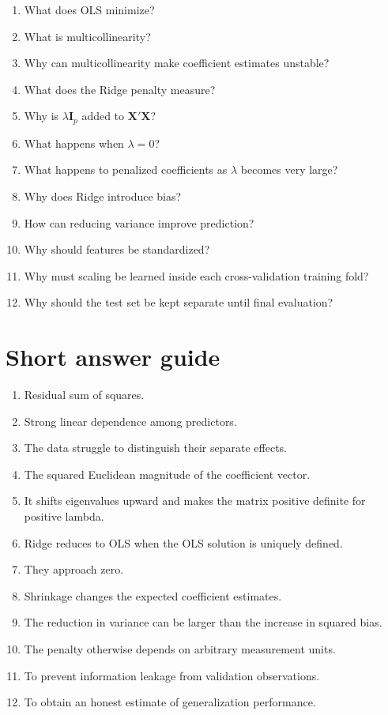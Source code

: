 \documentclass[11pt,a4paper,oneside]{book}
\theoremstyle{remark}
\newcommand{\X}{\mathbf X}
\newcommand{\I}{\mathbf I}
\begin{document}
\begin{enumerate}
\item What does OLS minimize?
\item What is multicollinearity?
\item Why can multicollinearity make coefficient estimates unstable?
\item What does the Ridge penalty measure?
\item Why is $\lambda\I_p$ added to $\X'\X$?
\item What happens when $\lambda=0$?
\item What happens to penalized coefficients as $\lambda$ becomes very large?
\item Why does Ridge introduce bias?
\item How can reducing variance improve prediction?
\item Why should features be standardized?
\item Why must scaling be learned inside each cross-validation training fold?
\item Why should the test set be kept separate until final evaluation?
\end{enumerate}

\section*{Short answer guide}
\begin{enumerate}
\item Residual sum of squares.
\item Strong linear dependence among predictors.
\item The data struggle to distinguish their separate effects.
\item The squared Euclidean magnitude of the coefficient vector.
\item It shifts eigenvalues upward and makes the matrix positive definite for
positive lambda.
\item Ridge reduces to OLS when the OLS solution is uniquely defined.
\item They approach zero.
\item Shrinkage changes the expected coefficient estimates.
\item The reduction in variance can be larger than the increase in squared bias.
\item The penalty otherwise depends on arbitrary measurement units.
\item To prevent information leakage from validation observations.
\item To obtain an honest estimate of generalization performance.
\end{enumerate}
\end{document}
